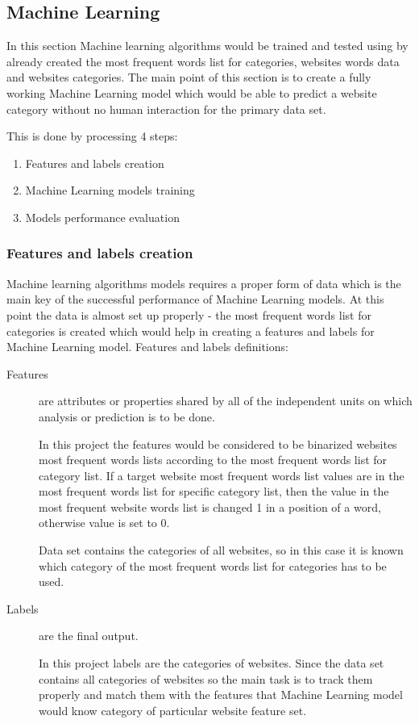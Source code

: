 \subsection{Machine Learning}


In this section Machine learning algorithms would be trained and tested using by already created the most frequent words list for categories, websites words data and websites categories. The main point of this section is to create a fully working Machine Learning model which would be able to predict a website category without no human interaction for the primary data set.

This is done by processing 4 steps:
\begin{enumerate}
    \item Features and labels creation
    \item Machine Learning models training
    \item Models performance evaluation
\end{enumerate}

\subsubsection{Features and labels creation}

Machine learning algorithms models requires a proper form of data which is the main key of the successful performance of Machine Learning models. At this point the data is almost set up properly - the most frequent words list for categories is created which would help in creating a features and labels for Machine Learning model. Features and labels definitions:
\begin{description}
    \item [Features] are attributes or properties shared by all of the independent units on which analysis or prediction is to be done. 
    
    In this project the features would be considered to be binarized websites most frequent words lists according to the most frequent words list for category list. If a target website most frequent words list values are in the most frequent words list for specific category list, then the value in the most frequent website words list is changed 1 in a position of a word, otherwise value is set to 0.
    
    
    Data set contains the categories of all websites, so in this case it is known which category of the most frequent words list for categories has to be used. 
    \item [Labels] are the final output.
    
    In this project labels are the categories of websites. Since the data set contains all categories of websites so the main task is to track them properly and match them with the features that Machine Learning model would know category of particular website feature set.
\end{description}


